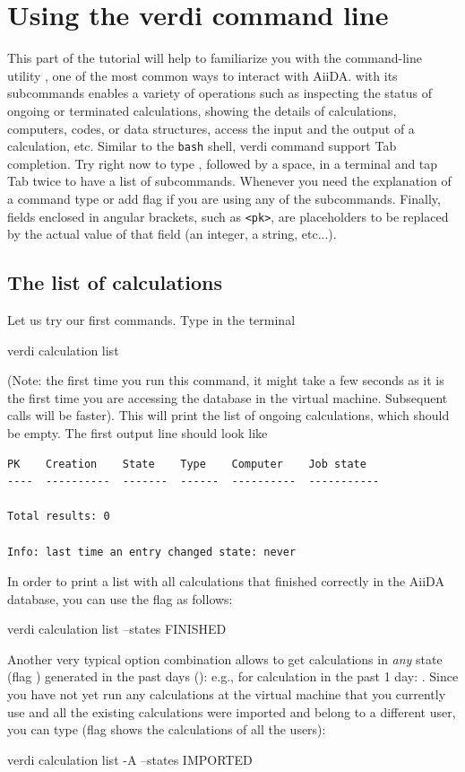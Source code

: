 \section[Verdi command line]{Using the verdi command line}

This part of the tutorial will help to familiarize you with the command-line utility , one of the most common ways to interact with AiiDA.  with its subcommands enables a variety of operations such as inspecting the status of ongoing or terminated calculations, showing the details of calculations, computers, codes, or data structures, access the input and the output of a calculation, etc.  Similar to the \texttt{bash} shell, verdi command support Tab completion. Try right now to type , followed by a space, in a terminal and tap Tab twice to have a list of subcommands. Whenever you need the explanation of a command type  or add  flag if you are using any of the  subcommands. 
Finally, fields enclosed in angular brackets, such as \texttt{<pk>}, are placeholders to be replaced by the actual value of that field (an integer, a string, etc...).

\subsection{The list of calculations}
Let us try our first  commands. Type in the terminal
\begin{bashcommand}
verdi calculation list
\end{bashcommand}
(Note: the first time you run this command, it might take a few seconds as it is the first time you are accessing the database in the virtual machine. Subsequent calls will be faster).
This will print the list of ongoing calculations, which should be empty. The first output line should look like
\begin{verbatim}
PK    Creation    State    Type    Computer    Job state
----  ----------  -------  ------  ----------  -----------

Total results: 0

Info: last time an entry changed state: never
\end{verbatim}

In order to print a list with all calculations that finished correctly in the AiiDA database, you can use the  flag as follows:
\begin{bashcommand}
verdi calculation list --states FINISHED
\end{bashcommand}
Another very typical option combination allows to get calculations in \emph{any} state (flag ) generated in the past  days (): e.g., for calculation in the past 1 day: . Since you have not yet run any calculations at the virtual machine that you currently use and all the existing calculations were imported and belong to a different user, you can type (flag  shows the calculations of all the users):
\begin{bashcommand}
verdi calculation list -A --states IMPORTED
\end{bashcommand}

